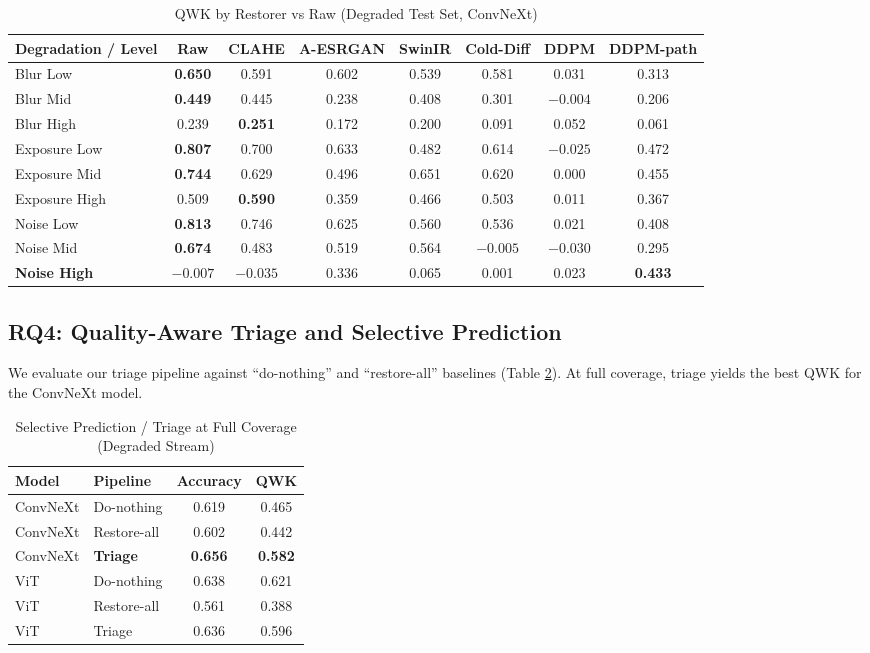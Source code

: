 \documentclass[conference]{IEEEtran}
\begin{document}
\begin{table}[htbp]
\caption{QWK by Restorer vs Raw (Degraded Test Set, ConvNeXt)}
\begin{center}
\begin{tabular}{lccccccc}
\toprule
\textbf{Degradation / Level} & \textbf{Raw} & \textbf{CLAHE} & \textbf{A-ESRGAN} & \textbf{SwinIR} & \textbf{Cold-Diff} & \textbf{DDPM} & \textbf{DDPM-path} \\
\midrule
Blur Low & \textbf{0.650} & 0.591 & 0.602 & 0.539 & 0.581 & 0.031 & 0.313 \\
Blur Mid & \textbf{0.449} & 0.445 & 0.238 & 0.408 & 0.301 & $-0.004$ & 0.206 \\
Blur High & 0.239 & \textbf{0.251} & 0.172 & 0.200 & 0.091 & 0.052 & 0.061 \\
Exposure Low & \textbf{0.807} & 0.700 & 0.633 & 0.482 & 0.614 & $-0.025$ & 0.472 \\
Exposure Mid & \textbf{0.744} & 0.629 & 0.496 & 0.651 & 0.620 & 0.000 & 0.455 \\
Exposure High & 0.509 & \textbf{0.590} & 0.359 & 0.466 & 0.503 & 0.011 & 0.367 \\
Noise Low & \textbf{0.813} & 0.746 & 0.625 & 0.560 & 0.536 & 0.021 & 0.408 \\
Noise Mid & \textbf{0.674} & 0.483 & 0.519 & 0.564 & $-0.005$ & $-0.030$ & 0.295 \\
\textbf{Noise High} & $-0.007$ & $-0.035$ & 0.336 & 0.065 & 0.001 & 0.023 & \textbf{0.433} \\
\bottomrule
\end{tabular}
\label{tab:qwk_recovery}
\end{center}
\end{table}

\subsection{RQ4: Quality-Aware Triage and Selective Prediction}
We evaluate our triage pipeline against ``do-nothing'' and ``restore-all'' baselines (Table \ref{tab:triage}). At full coverage, triage yields the best QWK for the ConvNeXt model. 

\begin{table}[htbp]
\caption{Selective Prediction / Triage at Full Coverage (Degraded Stream)}
\begin{center}
\begin{tabular}{llcc}
\toprule
\textbf{Model} & \textbf{Pipeline} & \textbf{Accuracy} & \textbf{QWK} \\
\midrule
ConvNeXt & Do-nothing & 0.619 & 0.465 \\
ConvNeXt & Restore-all & 0.602 & 0.442 \\
ConvNeXt & \textbf{Triage} & \textbf{0.656} & \textbf{0.582} \\
\midrule
ViT & Do-nothing & 0.638 & 0.621 \\
ViT & Restore-all & 0.561 & 0.388 \\
ViT & Triage & 0.636 & 0.596 \\
\bottomrule
\end{tabular}
\label{tab:triage}
\end{center}
\end{table}
\end{document}
